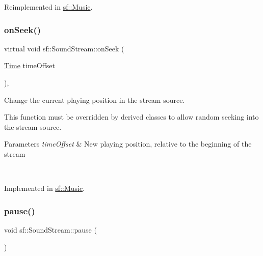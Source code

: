 Reimplemented in \mbox{\hyperlink{classsf_1_1_music_aa68a64bdaf5d16e9ed64f202f5c45e03}{sf\+::\+Music}}.

\mbox{\label{classsf_1_1_sound_stream_a907036dd2ca7d3af5ead316e54b75997}} 
\subsubsection{\texorpdfstring{onSeek()}{onSeek()}}
{\footnotesize\ttfamily virtual void sf\+::\+Sound\+Stream\+::on\+Seek (\begin{DoxyParamCaption}\item[{\mbox{\hyperlink{classsf_1_1_time}{Time}}}]{time\+Offset }\end{DoxyParamCaption})\hspace{0.3cm}{\ttfamily [protected]}, {}}



Change the current playing position in the stream source. 

This function must be overridden by derived classes to allow random seeking into the stream source.


\begin{DoxyParams}{Parameters}
{\em time\+Offset} & New playing position, relative to the beginning of the stream \begin{DoxyVerb}\end{DoxyVerb}
 \\
\hline
\end{DoxyParams}


Implemented in \mbox{\hyperlink{classsf_1_1_music_a15119cc0419c16bb334fa0698699c02e}{sf\+::\+Music}}.

\mbox{\label{classsf_1_1_sound_stream_a932ff181e661503cad288b4bb6fe45ca}} 
\subsubsection{\texorpdfstring{pause()}{pause()}}
{\footnotesize\ttfamily void sf\+::\+Sound\+Stream\+::pause (\begin{DoxyParamCaption}{ }\end{DoxyParamCaption})\hspace{0.3cm}{\ttfamily [virtual]}}



